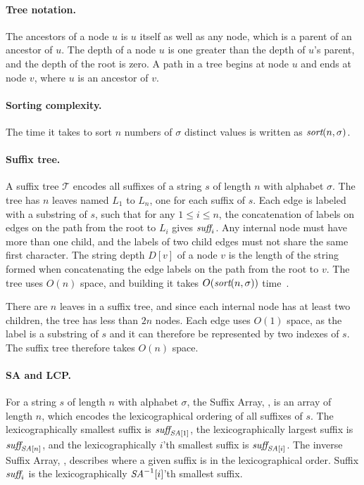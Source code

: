 \documentclass[a4]{article}
\begin{document}
\paragraph{Tree notation.}
The ancestors of a node $u$ is $u$ itself as well as any node, which is a parent of an ancestor of $u$. The depth of a node $u$ is one greater than the depth of $u$'s parent, and the depth of the root is zero. A path in a tree begins at node $u$ and ends at node $v$, where $u$ is an ancestor of $v$.

\paragraph{Sorting complexity.} The time it takes to sort $n$ numbers of $\sigma$ distinct values is written as $\textit{sort}(n,\sigma)$.

\paragraph{Suffix tree.} A suffix tree $\mathcal{T}$ encodes all suffixes of a string $s$ of length $n$ with alphabet $\sigma$. The tree has $n$ leaves named $L_1$ to $L_n$, one for each suffix of $s$. Each edge is labeled with a substring of $s$, such that for any $1\leq i\leq n$, the concatenation of labels on edges on the path from the root to $L_i$ gives $\textit{suff}_i$. Any internal node must have more than one child, and the labels of two child edges must not share the same first character. The string depth $D[v]$ of a node $v$ is the length of the string formed when concatenating the edge labels on the path from the root to $v$.
The tree uses $O(n)$ space, and building it takes $O(\textit{sort}(n,\sigma))$ time~\cite{sort-complexity}.

\ifreport

There are $n$ leaves in a suffix tree, and since each internal node has at least two children, the tree has less than $2n$ nodes. Each edge uses $O(1)$ space, as the label is a substring of $s$ and it can therefore be represented by two indexes of $s$. The suffix tree therefore takes $O(n)$ space.

\fi %

\paragraph{SA and LCP.} For a string $s$ of length $n$ with alphabet $\sigma$, the Suffix Array, \SA, is an array of length $n$, which encodes the lexicographical ordering of all suffixes of $s$. The lexicographically smallest suffix is $\textit{suff}_{\textit{SA}[1]}$, the lexicographically largest suffix is $\textit{suff}_{\textit{SA}[n]}$, and the lexicographically $i$'th smallest suffix is $\textit{suff}_{\textit{SA}[i]}$. The inverse Suffix Array, \SAi, describes where a given suffix is in the lexicographical order. Suffix $\textit{suff}_i$ is the lexicographically $\textit{SA}^{-1}[i]$'th smallest suffix.
\end{document}

